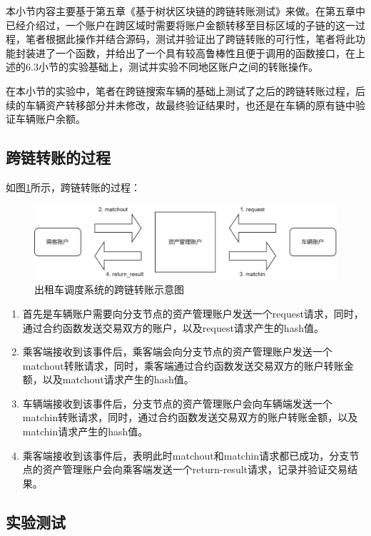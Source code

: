 本小节内容主要基于第五章《基于树状区块链的跨链转账测试》来做。在第五章中已经介绍过，一个账户在跨区域时需要将账户金额转移至目标区域的子链的这一过程，笔者根据此操作并结合源码，测试并验证出了跨链转账的可行性，笔者将此功能封装进了一个函数，并给出了一个具有较高鲁棒性且便于调用的函数接口，在上述的6.3小节的实验基础上，测试并实验不同地区账户之间的转账操作。

在本小节的实验中，笔者在跨链搜索车辆的基础上测试了之后的跨链转账过程，后续的车辆资产转移部分并未修改，故最终验证结果时，也还是在车辆的原有链中验证车辆账户余额。

\subsection{跨链转账的过程}

如图\ref{fig:出租车调度系统的跨链转账示意图}所示，跨链转账的过程：

\begin{figure}
	\centering
	\includegraphics[width=\textwidth]{figures/出租车调度系统的跨链转账示意图.png}
	\caption{出租车调度系统的跨链转账示意图}
	\label{fig:出租车调度系统的跨链转账示意图}
\end{figure}

\begin{enumerate}
    \item 首先是车辆账户需要向分支节点的资产管理账户发送一个request请求，同时，通过合约函数发送交易双方的账户，以及request请求产生的hash值。
    \item 乘客端接收到该事件后，乘客端会向分支节点的资产管理账户发送一个matchout转账请求，同时，乘客端通过合约函数发送交易双方的账户转账金额，以及matchout请求产生的hash值。
    \item 车辆端接收到该事件后，分支节点的资产管理账户会向车辆端发送一个matchin转账请求，同时，通过合约函数发送交易双方的账户转账金额，以及matchin请求产生的hash值。
    \item 乘客端接收到该事件后，表明此时matchout和matchin请求都已成功，分支节点的资产管理账户会向乘客端发送一个return-result请求，记录并验证交易结果。
\end{enumerate}

\subsection{实验测试}

